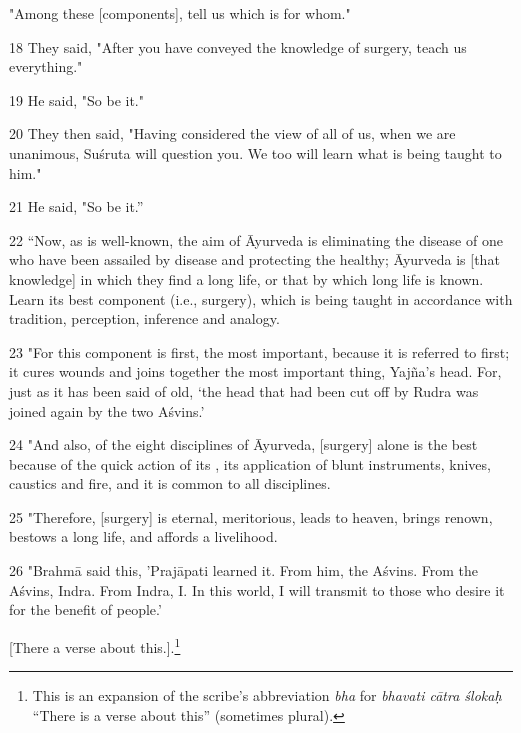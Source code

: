 \begin{translation}
    "Among these [components], tell us which is for whom."
    
    \item[18] They said, "After you have conveyed the knowledge of surgery, 
    teach 
    us everything."
    
    \item[19] He said, "So be it."
    
    \item[20] They then said, "Having considered the view of all of us, when we 
    are 
    unanimous, Suśruta will question you. We too will learn what is being taught to 
    him."
    
    \item[21] He said, "So be it.”
    
    \item[22] “Now, as is well-known, the aim of Āyurveda is eliminating the 
    disease of one who have been assailed by disease and protecting the healthy;  
    Āyurveda is [that knowledge] in which they find a long life, or that by which 
    long life is known. Learn its best component (i.e., surgery), which is being 
    taught in accordance with tradition, perception, inference and analogy.
    
    \item[23] "For this component is first, the most important, because it is 
    referred to first; it cures wounds and joins together the most important thing, 
    Yajña's head. For, just as it has been said of old, `the head that had been cut 
    off by Rudra was joined again by the two Aśvins.'
    
    \item[24] "And also, of the eight disciplines of Āyurveda, [surgery]
alone is the best because of the quick action of its
, its application of blunt instruments, knives,
caustics and fire, and it is common to all disciplines.
    
    \item[25] "Therefore, [surgery] is eternal, meritorious, leads to heaven, 
    brings renown, bestows a long life, and affords a livelihood.
    
    \item[26] "Brahmā said this, 'Prajāpati learned it. From him, the
Aśvins. From the Aśvins, Indra. From Indra, I. In this world, I will
transmit to those who desire it for the benefit of people.'
    
    [There a verse about this.].\footnote{This is an expansion 
    of the scribe's abbreviation \emph{bha} for \emph{bhavati cātra ślokaḥ} 
    “There is a verse about this” (sometimes plural).\label{bha}}
    

\end{translation}
